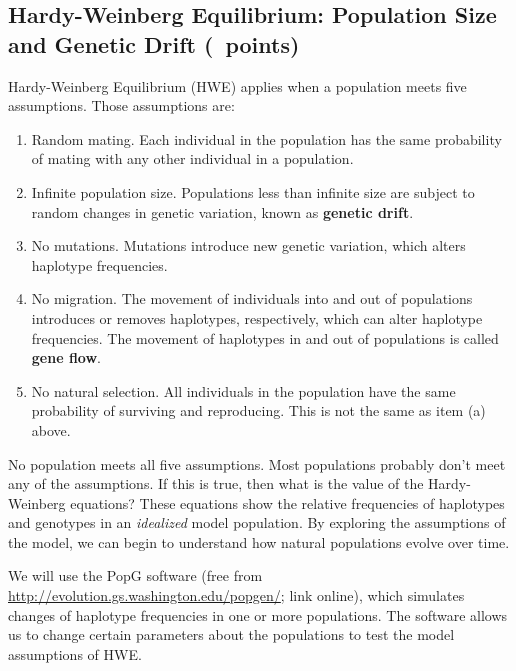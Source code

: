 \documentclass[11pt, addpoints, hidelinks]{exam}
\begin{document}
\subsection*{Hardy-Weinberg Equilibrium: Population Size and Genetic Drift (\numpoints\ points)}

Hardy-Weinberg Equilibrium (HWE) applies when a population meets five assumptions. Those assumptions
are:

\begin{enumerate}

\item Random mating. Each individual in the population has the same
probability of mating with any other individual in a population.

\item Infinite population size. Populations less than infinite size
are subject to random changes in genetic variation, known as
\textbf{genetic drift}.

\item No mutations. Mutations introduce new genetic variation, which
alters haplotype frequencies.

\item No migration. The movement of individuals into and out of
populations introduces or removes haplotypes, respectively, which can
alter haplotype frequencies. The movement of haplotypes in and out of
populations is called \textbf{gene flow}.

\item No natural selection. All individuals in the population have
the same probability of surviving and reproducing. This is not the same
as item (a) above.

\end{enumerate}

No population meets all five assumptions. Most populations probably
don't meet any of the assumptions. If this is true, then what is the
value of the Hardy-Weinberg equations? These equations show the relative
frequencies of haplotypes and genotypes in an \emph{idealized} model
population. By exploring the assumptions of the model, we can begin to
understand how natural populations evolve over time.

We will use the PopG software (free from
\url{http://evolution.gs.washington.edu/popgen/}; link online), which
simulates changes of haplotype frequencies in one or more populations.
The software allows us to change certain parameters about the
populations to test the model assumptions of HWE.
\end{document}
